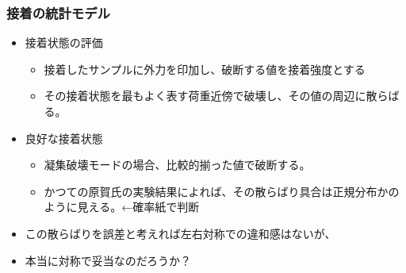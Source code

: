 \documentclass[10pt, dvipdfmx]{beamer}
\begin{document}
\begin{frame}
	\frametitle{接着の統計モデル}
	\begin{itemize}
		\item 接着状態の評価
		\begin{itemize}
			\item 接着したサンプルに外力を印加し、破断する値を接着強度とする
			\item その接着状態を最もよく表す荷重近傍で破壊し、その値の周辺に散らばる。
		\end{itemize}
		\item 良好な接着状態
		\begin{itemize}
			\item 凝集破壊モードの場合、比較的揃った値で破断する。
			\item かつての原賀氏の実験結果によれば、その散らばり具合は正規分布かのように見える。←確率紙で判断
		\end{itemize}
		\item この散らばりを誤差と考えれば左右対称での違和感はないが、
		\item 本当に対称で妥当なのだろうか？
	\end{itemize}
\end{frame}


	
\end{document}
